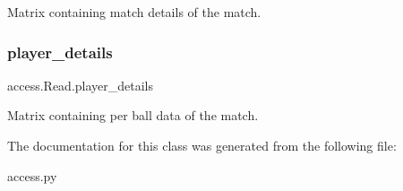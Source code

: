Matrix containing match details of the match. 

\mbox{\label{classaccess_1_1Read_a4682ffb3f43ec732d63d89d8ee78cc1a}} 
\subsubsection{\texorpdfstring{player\+\_\+details}{player\_details}}
{\footnotesize\ttfamily access.\+Read.\+player\+\_\+details}



Matrix containing per ball data of the match. 



The documentation for this class was generated from the following file\+:\begin{DoxyCompactItemize}
\item 
access.\+py\end{DoxyCompactItemize}
